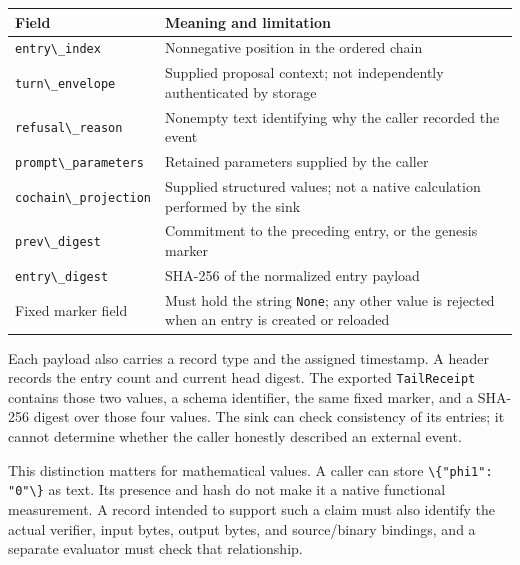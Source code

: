 \documentclass[
  11pt,
]{article}
\newcommand{\passthrough}[1]{#1}
\begin{document}
\begin{longtable}[]{@{}
  >{\raggedright\arraybackslash}p{}
  >{\raggedright\arraybackslash}p{}@{}}
\toprule\noalign{}
\begin{minipage}[b]{\linewidth}\raggedright
Field
\end{minipage} & \begin{minipage}[b]{\linewidth}\raggedright
Meaning and limitation
\end{minipage} \\
\midrule\noalign{}
\endhead
\bottomrule\noalign{}
\endlastfoot
\passthrough{\lstinline!entry\_index!} & Nonnegative position in the
ordered chain \\
\passthrough{\lstinline!turn\_envelope!} & Supplied proposal context;
not independently authenticated by storage \\
\passthrough{\lstinline!refusal\_reason!} & Nonempty text identifying
why the caller recorded the event \\
\passthrough{\lstinline!prompt\_parameters!} & Retained parameters
supplied by the caller \\
\passthrough{\lstinline!cochain\_projection!} & Supplied structured
values; not a native calculation performed by the sink \\
\passthrough{\lstinline!prev\_digest!} & Commitment to the preceding
entry, or the genesis marker \\
\passthrough{\lstinline!entry\_digest!} & SHA-256 of the normalized
entry payload \\
Fixed marker field & Must hold the string
\passthrough{\lstinline!None!}; any other value is rejected when an
entry is created or reloaded \\
\end{longtable}

Each payload also carries a record type and the assigned timestamp. A
header records the entry count and current head digest. The exported
\passthrough{\lstinline!TailReceipt!} contains those two values, a
schema identifier, the same fixed marker, and a SHA-256 digest over
those four values. The sink can check consistency of its entries; it
cannot determine whether the caller honestly described an external
event.

This distinction matters for mathematical values. A caller can store
\passthrough{\lstinline!\{"phi1": "0"\}!} as text. Its presence and hash
do not make it a native functional measurement. A record intended to
support such a claim must also identify the actual verifier, input
bytes, output bytes, and source/binary bindings, and a separate
evaluator must check that relationship.
\end{document}
